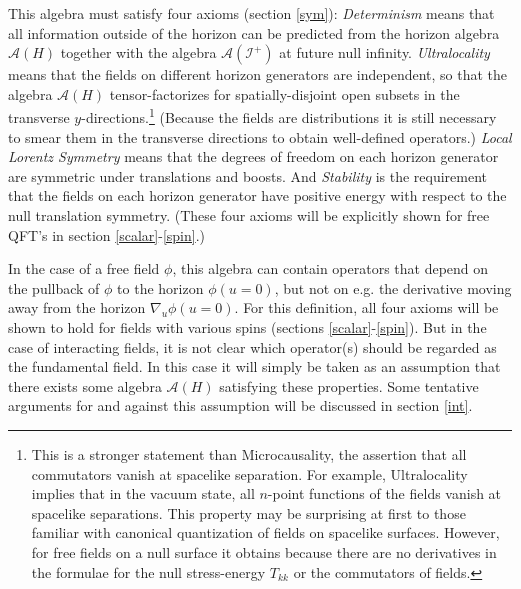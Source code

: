 \documentclass{article}
\begin{document}
\begin{enumerate}
This algebra must satisfy four axioms (section \ref{sym}):  \textit{Determinism} means that all information outside of the horizon can be predicted from the horizon algebra $\mathcal{A}(H)$ together with the algebra $\mathcal{A}(\mathcal{I}^+)$ at future null infinity.  \textit{Ultralocality} means that the fields on different horizon generators are independent, so that the algebra $\mathcal{A}(H)$
tensor-factorizes for spatially-disjoint open subsets in the transverse $y$-directions.\footnote{This is a stronger statement than Microcausality, the assertion that all commutators vanish at spacelike separation.  For example, Ultralocality implies that in the vacuum state, all $n$-point functions of the fields vanish at spacelike separations.  This property may be surprising at first to those familiar with canonical quantization of fields on spacelike surfaces.  However, for free fields on a null surface it obtains because there are no derivatives in the formulae for the null stress-energy $T_{kk}$ or the commutators of fields.}  (Because the fields are distributions it is still necessary to smear them in the transverse directions to obtain well-defined operators.) \textit{Local Lorentz Symmetry} means that the degrees of freedom on each horizon generator are symmetric under translations and boosts.  And \textit{Stability} is the requirement that the fields on each horizon generator have positive energy with respect to the null translation symmetry.  (These four axioms will be explicitly shown for free QFT's in section \ref{scalar}-\ref{spin}.)

In the case of a free field $\phi$, this algebra can contain operators that depend on the pullback of $\phi$ to the horizon $\phi(u = 0)$, but not on e.g. the derivative moving away from the horizon $\nabla_u \phi(u = 0)$.  For this definition, all four axioms will be shown to hold for fields with various spins (sections \ref{scalar}-\ref{spin}).  But in the case of interacting fields, it is not clear which operator(s) should be regarded as the fundamental field.  In this case it will simply be taken as an assumption that there exists some algebra $\mathcal{A}(H)$ satisfying these properties.  Some tentative arguments for and against this assumption will be discussed in section \ref{int}.


\end{enumerate}
\end{document}
